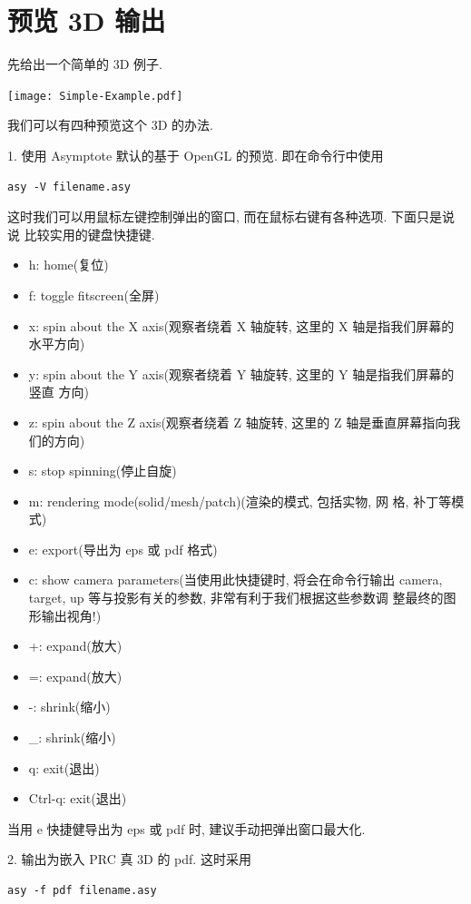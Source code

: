 \documentclass[nofonts,CJKnormalspaces]{ctexbook}[2009/05/20]
\begin{document}
\section{预览 3D 输出}
先给出一个简单的 3D 例子.
\begin{center}\texttt{[image: Simple-Example.pdf]}\end{center}%

我们可以有四种预览这个 3D 的办法.

1. 使用 Asymptote 默认的基于 OpenGL 的预览. 即在命令行中使用
\begin{verbatim}
asy -V filename.asy
\end{verbatim}

这时我们可以用鼠标左键控制弹出的窗口, 而在鼠标右键有各种选项. 下面只是说说
比较实用的键盘快捷键.

\begin{itemize}
\item h: home(复位)
\item f: toggle fitscreen(全屏)
\item x: spin about the X axis(观察者绕着 X 轴旋转, 这里的 X 轴是指我们屏幕的
  水平方向)
\item y: spin about the Y axis(观察者绕着 Y 轴旋转, 这里的 Y 轴是指我们屏幕的竖直
  方向)
\item z: spin about the Z axis(观察者绕着 Z 轴旋转, 这里的 Z 轴是垂直屏幕指向我
  们的方向)
\item s: stop spinning(停止自旋)
\item m: rendering mode(solid/mesh/patch)(渲染的模式, 包括实物, 网
  格, 补丁等模式)
\item e: export(导出为 eps 或 pdf 格式)
\item c: show camera parameters(当使用此快捷键时, 将会在命令行输出
  camera, target, up 等与投影有关的参数, 非常有利于我们根据这些参数调
  整最终的图形输出视角!)
\item +: expand(放大)
\item =: expand(放大)
\item -: shrink(缩小)
\item \_: shrink(缩小)
\item q: exit(退出)
\item Ctrl-q: exit(退出)
\end{itemize}
当用 e 快捷健导出为 eps 或 pdf 时, 建议手动把弹出窗口最大化.

2. 输出为嵌入 PRC 真 3D 的 pdf. 这时采用
\begin{verbatim}
asy -f pdf filename.asy
\end{verbatim}
\end{document}
